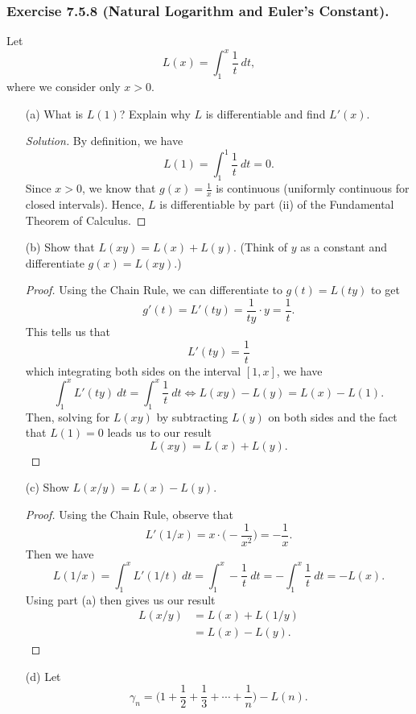 \subsubsection{Exercise 7.5.8 (Natural Logarithm and Euler's Constant).} Let 
\[  L(x) = \int_{ 1 }^{ x } \frac{ 1 }{ t }  \  dt, \]
where we consider only \( x > 0  \).
\begin{enumerate}
    \item[(a)] What is \( L(1)  \)? Explain why \( L  \) is differentiable and find \( L'(x)  \).
		\begin{proof}[Solution]
		By definition, we have 
		\[  L(1) = \int_{ 1 }^{ 1 } \frac{ 1 }{ t } \   dt = 0. \] Since \( x > 0  \), we know that \( g(x) = \frac{ 1 }{ x  }  \) is continuous (uniformly continuous for closed intervals). Hence, \( L  \) is differentiable by part (ii) of the Fundamental Theorem of Calculus.
		\end{proof}
	\item[(b)] Show that \( L(xy) = L(x) + L(y)  \). (Think of \( y  \) as a constant and differentiate \( g(x) = L(xy)  \).) 
		\begin{proof}
		Using the Chain Rule, we can differentiate to \( g(t) = L(ty)  \) to get 
		\[  g'(t) = L'(ty) = \frac{ 1 }{ ty } \cdot y = \frac{ 1 }{ t }.  \]
		This tells us that 
		\[  L'(ty) = \frac{ 1 }{ t } \]
		which integrating both sides on the interval \( [1,x]  \), we have 
		\[  \int_{ 1 }^{ x } L'(ty)   \ dt = \int_{ 1 }^{ x } \frac{ 1 }{ t } \    dt \iff L(xy) - L(y) = L(x) - L(1)   .   \]
	Then, solving for \( L(xy)  \) by subtracting \( L(y)  \) on both sides and the fact that \( L(1) = 0  \) leads us to our result
	\[  L(xy) = L(x) + L(y). \]
		\end{proof}
	\item[(c)] Show \( L(x/y) = L(x) - L(y)  \).
		\begin{proof}
			Using the Chain Rule, observe that
		\[  L'(1/x) = x \cdot \Big( - \frac{ 1 }{ x^2 }  \Big) = -\frac{ 1 }{ x }.    \]
		Then we have 
		\[ L(1/x) = \int_{ 1 }^{ x } L'(1/t) \ dt = \int_{ 1 }^{ x } - \frac{ 1 }{ t } \    dt  = - \int_{ 1 }^{ x } \frac{ 1 }{ t } \    dt = - L(x). \]
		Using part (a) then gives us our result  
		\begin{align*}
		    L(x/y) &= L(x) + L(1/y) \\
				   &= L(x) - L(y).
		\end{align*}
		\end{proof}
	\item[(d)] Let 
		\[  \gamma_{n} = \Big( 1 + \frac{ 1 }{ 2 } + \frac{ 1 }{ 3 } + \dotsb + \frac{ 1 }{ n }  \Big) - L(n). \]

\end{enumerate}
